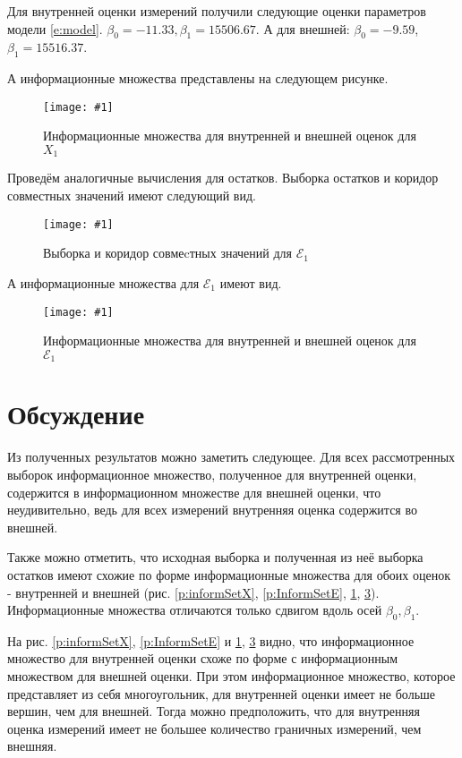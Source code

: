 \documentclass[a4paper,12pt]{article}
\newcommand{\plot}[3]{
    \begin{figure}[H]
        \begin{center}
            \texttt{[image: \#1]}
            \caption{#2}
            \label{#3}
        \end{center}
    \end{figure}
}
\begin{document}
    Для внутренней оценки измерений получили следующие оценки параметров модели \ref{e:model}.
    $ \beta_0 = -11.33, \beta_1 = 15506.67 $.
    А для внешней: $ \beta_0 = -9.59 $, $ \beta_1 = 15516.37 $.
    
    А информационные множества представлены на следующем рисунке.
    \plot{TwinInformSetX1}{Информационные множества для внутренней и внешней оценок для $ X_1 $}{p:informSetX1}

    Проведём аналогичные вычисления для остатков.
    Выборка остатков и коридор совместных значений имеют следующий вид.
    \plot{TwinInformSetCorridorE1}{Выборка и коридор совмеcтных значений для $ \mathcal{E}_1 $}{p:informSetCorridorE1}

    А информационные множества для $ \mathcal{E}_1 $ имеют вид.
    \plot{TwinInformSetE1}{Информационные множества для внутренней и внешней оценок для $ \mathcal{E}_1 $}{p:informSetE1}

    \section{Обсуждение}
    \quad Из полученных результатов можно заметить следующее.
    Для всех рассмотренных выборок информационное множество, полученное для внутренней оценки,
    содержится в информационном множестве для внешней оценки, что неудивительно, ведь для всех измерений
    внутренняя оценка содержится во внешней.
    
    Также можно отметить, что исходная выборка и полученная из неё выборка остатков имеют
    схожие по форме информационные множества для обоих оценок - внутренней и внешней
    (рис. \ref{p:informSetX}, \ref{p:InformSetE}, \ref{p:informSetX1}, \ref{p:informSetE1}).
    Информационные множества отличаются только сдвигом вдоль осей $ \beta_0, \beta_1 $.

    На рис. \ref{p:informSetX}, \ref{p:InformSetE} и \ref{p:informSetX1}, \ref{p:informSetE1} видно,
    что информационное множество для внутренней оценки схоже по форме с информационным множеством для внешней оценки.
    При этом информационное множество, которое представляет из себя многоугольник,
    для внутренней оценки имеет не больше вершин, чем для внешней.
    Тогда можно предположить, что для внутренняя оценка измерений имеет не большее количество граничных измерений, чем внешняя.
\end{document}
